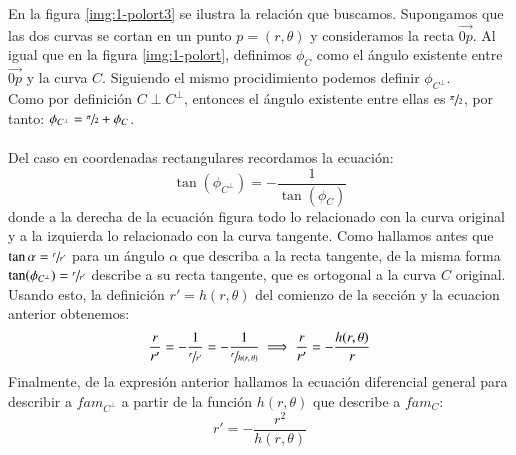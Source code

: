 En la figura \ref{img:1-polort3} se ilustra la relación que buscamos. Supongamos que las dos curvas se cortan en un punto $p = (r, \theta)$ y consideramos la recta $\vec{0p}$. Al igual que en la figura \ref{img:1-polort}, definimos $\phi_C$ como el ángulo existente entre $\vec{0p}$ y la curva $C$. Siguiendo el mismo procidimiento podemos definir $\phi_{C^\perp}$.\\
Como por definición $C \perp C^{\perp}$, entonces el ángulo existente entre ellas es $\sfrac{\pi}{2}$, por tanto: $\phi_{C^\perp} = \sfrac{\pi}{2} + \phi_C$.\\\\
Del caso en coordenadas rectangulares recordamos la ecuación:
$$
\tan(\phi_{C^\perp}) = -\frac{1}{ \tan(\phi_C)}
$$
donde a la derecha de la ecuación figura todo lo relacionado con la curva original y a la izquierda lo relacionado con la curva tangente. Como hallamos antes que $\tan\alpha = \sfrac{r}{r'}$ para un ángulo $\alpha$ que describa a la recta tangente, de la misma forma $\tan(\phi_{C^\perp}) = \sfrac{r}{r'}$ describe a su recta tangente, que es ortogonal a la curva $C$ original.\\ Usando esto, la definición $r' = h(r, \theta)$ del comienzo de la sección y la ecuacion anterior obtenemos:
$$
\frac{r}{r'} = -\frac{1}{\sfrac{r}{r'}} = -\frac{1}{\sfrac{r}{h(r,\theta)}} \implies \frac{r}{r'} = -\frac{h(r,\theta)}{r}
$$
Finalmente, de la expresión anterior hallamos la ecuación diferencial general para describir a $fam_{C^\perp}$ a partir de la función $h(r, \theta)$ que describe a $fam_C$:
$$
    r' = -\frac{r^2}{h(r, \theta)}
$$
